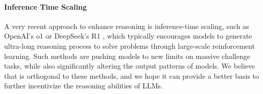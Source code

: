 \paragraph{Inference Time Scaling}
A very recent approach to enhance reasoning is inference-time scaling, such as OpenAI's o1 \cite{jaech2024openaio1} or DeepSeek's R1 \cite{deepseekai2025r1}, which typically encourages models to generate ultra-long reasoning process to solve problems through large-scale reinforcement learning. Such methods are pushing models to new limits on massive challenge tasks, while also significantly altering the output patterns of models. We believe that \codeio{} is orthogonal to these methods, and we hope it can provide a better basis to further incentivize the reasoning abilities of LLMs.
